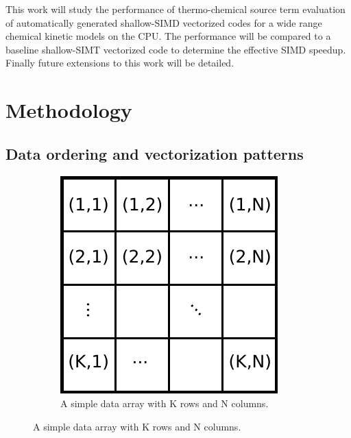 \documentclass[12pt,number,sort&compress]{elsarticle}
\begin{document}
This work will study the performance of thermo-chemical source term evaluation of automatically generated shallow-SIMD vectorized codes for a wide range chemical kinetic models on the CPU.
The performance will be compared to a baseline shallow-SIMT vectorized code to determine the effective SIMD speedup.
Finally future extensions to this work will be detailed.

\section{Methodology}
\subsection{Data ordering and vectorization patterns}
\label{S:data}

\begin{figure}[htb]
  \centering
  \begin{minipage}{0.45\linewidth}
    \begin{subfigure}[t]{\textwidth}
      \includegraphics[width=\textwidth]{data_layouts.pdf}
      \caption{A simple data array with K rows and N columns.}
      \label{F:mem}
    \end{subfigure}
  \end{minipage}
  \hfil
  \begin{minipage}{0.45\linewidth}

\end{minipage}
\end{figure}
\end{document}
